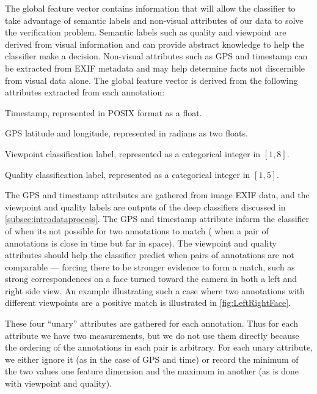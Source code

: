 The global feature vector contains information that will allow the classifier to take advantage of semantic
  labels and non-visual attributes of our data to solve the verification problem.
Semantic labels such as quality and viewpoint are derived from visual information and can provide abstract
  knowledge to help the classifier make a decision.
Non-visual attributes such as GPS and timestamp can be extracted from EXIF metadata and may help determine facts
  not discernible from visual data alone.
The global feature vector is derived from the following attributes extracted from each annotation:
\begin{enumln}

    \item Timestamp, represented in POSIX format as a float.

    \item GPS latitude and longitude, represented in radians as two floats. 

    \item Viewpoint classification label, represented as a categorical integer in $[1,8]$.

    \item Quality classification label, represented as a categorical integer in $[1,5]$.
\end{enumln}
The GPS and timestamp attributes are gathered from image EXIF data, and the viewpoint and quality labels are
  outputs of the deep classifiers discussed in \cref{subsec:introdataprocess}.
The GPS and timestamp attribute inform the classifier of when its not possible for two annotations to match
  (\eg{} when a pair of annotations is close in time but far in space).
The viewpoint and quality attributes should help the classifier predict when pairs of annotations are not
  comparable --- forcing there to be stronger evidence to form a match, such as strong correspondences on a face
  turned toward the camera in both a left and right side view.
An example illustrating such a case where two annotations with different viewpoints are a positive match is
  illustrated in \cref{fig:LeftRightFace}.

\LeftRightFace{}

These four ``unary'' attributes are gathered for each annotation.
Thus for each attribute we have two measurements, but we do not use them directly because the ordering of the
  annotations in each pair is arbitrary.
For each unary attribute, we either ignore it (as in the case of GPS and time) or record the minimum of the two
  values one feature dimension and the maximum in another (as is done with viewpoint and quality).

